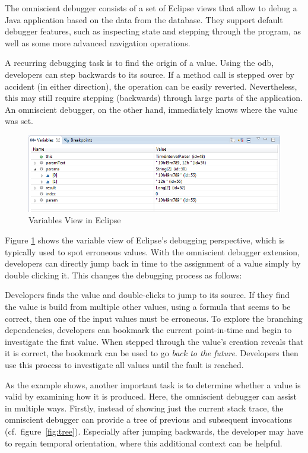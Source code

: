 The omniscient debugger consists of a set of Eclipse views that allow to debug a Java application based on the data from the database.
They support default debugger features, such as inspecting state and stepping through the program, as well as some more advanced navigation operations.

A recurring debugging task is to find the origin of a value.
Using the \ac{odb}, developers can step backwards to its source.
If a method call is stepped over by accident (in either direction), the operation can be easily reverted.
Nevertheless, this may still require stepping (backwards) through large parts of the application.
An omniscient debugger, on the other hand, immediately knows where the value was set.

\begin{figure}[ht]
\centering
\includegraphics[width=.8\textwidth]{img/variables.png}
\caption{Variables View in Eclipse}
\label{fig:variables}
\end{figure}

Figure \ref{fig:variables} shows the variable view of Eclipse's debugging perspective, which is typically used to spot erroneous values.
With the omniscient debugger extension, developers can directly jump back in time to the assignment of a value simply by double clicking it.
This changes the debugging process as follows:

Developers finds the value and double-clicks to jump to its source.
If they find the value is build from multiple other values, using a formula that seems to be correct, then one of the input values must be erroneous.
To explore the branching dependencies, developers can bookmark the current point-in-time and begin to investigate the first value.
When stepped through the value's creation reveals that it is correct, the bookmark can be used to go \emph{back to the future}.
Developers then use this process to investigate all values until the fault is reached.

As the example shows, another important task is to determine whether a value is valid by examining how it is produced.
Here, the omniscient debugger can assist in multiple ways.
Firstly, instead of showing just the current stack trace, the omniscient debugger can provide a tree of previous and subsequent invocations (cf.~figure~\ref{fig:tree}).
Especially after jumping backwards, the developer may have to regain temporal orientation, where this additional context can be helpful.

